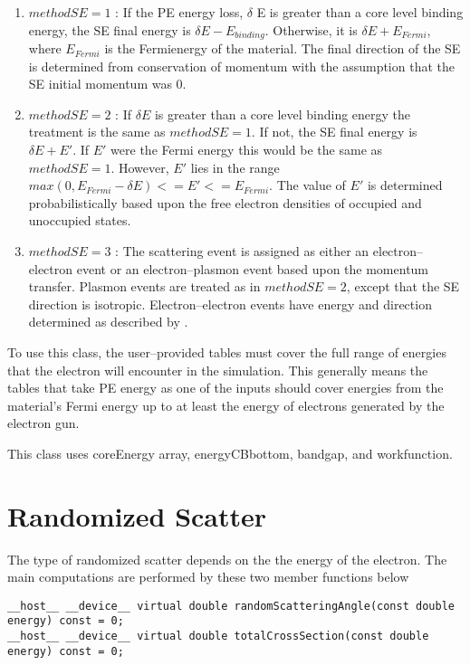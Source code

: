 \begin{enumerate}
    \item $methodSE=1$ \cite{ding1996monte}: If the PE energy loss, $\delta$ E is greater than a core level binding energy, the SE final energy is $\delta E-E_{binding}$. Otherwise, it is $\delta E + E_{Fermi}$, where $E_{Fermi}$ is the Fermienergy of the material. The final direction of the SE is determined from conservation of momentum with the assumption that the SE initial momentum was 0.
    \item $methodSE=2$ \cite{ding2001monte}: If $\delta E$ is greater than a core level binding energy the treatment is the same as $methodSE=1$. If not, the SE final energy is $\delta E + E'$. If $E'$ were the Fermi energy this would be the same as $methodSE = 1$. However, $E'$ lies in the range $max(0, E_{Fermi} - \delta E) <= E' <= E_{Fermi}$. The value of $E'$ is determined probabilistically based upon the free electron densities of occupied and unoccupied states.
    \item $methodSE=3$ \cite{mao2008electron}: The scattering event is assigned as either an electron--electron event or an electron--plasmon event based upon the momentum transfer. Plasmon events are treated as in $methodSE = 2$, except that the SE direction is isotropic. Electron--electron events have energy and direction determined as described by \cite{mao2008electron}.
\end{enumerate}

To use this class, the user--provided tables must cover the full range of energies that the electron will encounter in the simulation. This generally means the tables that take PE energy as one of the inputs should cover energies from the material's Fermi energy up to at least the energy of electrons generated by the electron gun.

This class uses coreEnergy array, energyCBbottom, bandgap, and workfunction.

\section{Randomized Scatter}
The type of randomized scatter depends on the the energy of the electron. The main computations are performed by these two member functions below

\begin{lstlisting}
__host__ __device__ virtual double randomScatteringAngle(const double energy) const = 0;
__host__ __device__ virtual double totalCrossSection(const double energy) const = 0;
\end{lstlisting}

